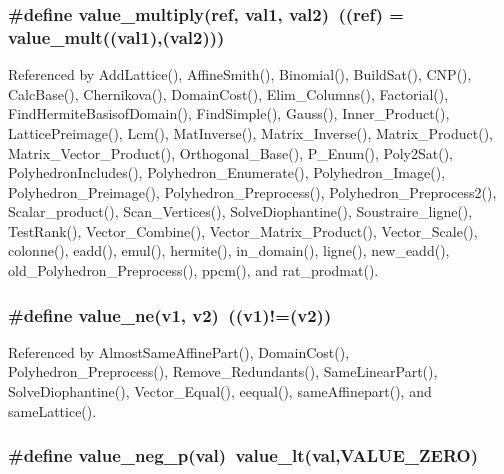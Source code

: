 \subsubsection{\setlength{\rightskip}{0pt plus 5cm}\#define value\_\-multiply(ref, val1, val2)\ ((ref) = value\_\-mult((val1),(val2)))}\label{arithmetique_8h_a47}




Referenced by Add\-Lattice(), Affine\-Smith(), Binomial(), Build\-Sat(), CNP(), Calc\-Base(), Chernikova(), Domain\-Cost(), Elim\_\-Columns(), Factorial(), Find\-Hermite\-Basisof\-Domain(), Find\-Simple(), Gauss(), Inner\_\-Product(), Lattice\-Preimage(), Lcm(), Mat\-Inverse(), Matrix\_\-Inverse(), Matrix\_\-Product(), Matrix\_\-Vector\_\-Product(), Orthogonal\_\-Base(), P\_\-Enum(), Poly2Sat(), Polyhedron\-Includes(), Polyhedron\_\-Enumerate(), Polyhedron\_\-Image(), Polyhedron\_\-Preimage(), Polyhedron\_\-Preprocess(), Polyhedron\_\-Preprocess2(), Scalar\_\-product(), Scan\_\-Vertices(), Solve\-Diophantine(), Soustraire\_\-ligne(), Test\-Rank(), Vector\_\-Combine(), Vector\_\-Matrix\_\-Product(), Vector\_\-Scale(), colonne(), eadd(), emul(), hermite(), in\_\-domain(), ligne(), new\_\-eadd(), old\_\-Polyhedron\_\-Preprocess(), ppcm(), and rat\_\-prodmat().

\subsubsection{\setlength{\rightskip}{0pt plus 5cm}\#define value\_\-ne(v1, v2)\ ((v1)!=(v2))}\label{arithmetique_8h_a23}




Referenced by Almost\-Same\-Affine\-Part(), Domain\-Cost(), Polyhedron\_\-Preprocess(), Remove\_\-Redundants(), Same\-Linear\-Part(), Solve\-Diophantine(), Vector\_\-Equal(), eequal(), same\-Affinepart(), and same\-Lattice().

\subsubsection{\setlength{\rightskip}{0pt plus 5cm}\#define value\_\-neg\_\-p(val)\ value\_\-lt(val,VALUE\_\-ZERO)}\label{arithmetique_8h_a64}




